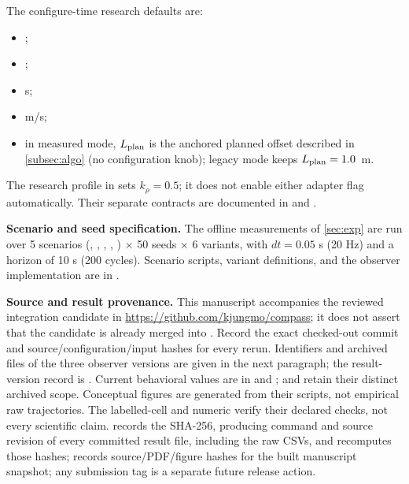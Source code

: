 The configure-time research defaults are:
\begin{itemize}
\setlength{\itemsep}{0pt}
\setlength{\parsep}{0pt}
\item {};
\item {};
\item {} s;
\item {} m/s;
\item in measured mode, $L_{\rm plan}$ is the anchored planned offset described in \cref{subsec:algo} (no configuration knob); legacy mode keeps $L_{\rm plan}=1.0$~m.
\end{itemize}

The research profile in  sets $k_\rho=0.5$; it does not enable either adapter flag automatically. Their separate contracts are documented in  and .



\noindent\textbf{Scenario and seed specification.} The offline measurements of \cref{sec:exp} are run over 5 scenarios (, , , , ) $\times$ 50 seeds $\times$ 6 variants, with $dt = 0.05$ s (20 Hz) and a horizon of 10 s (200 cycles). Scenario scripts, variant definitions, and the observer implementation are in .

\noindent\textbf{Source and result provenance.} This manuscript accompanies the reviewed integration candidate in \url{https://github.com/kjungmo/compass}; it does not assert that the candidate is already merged into . Record the exact checked-out commit and source/configuration/input hashes for every rerun. Identifiers and archived files of the three observer versions are given in the next paragraph; the result-version record is . Current behavioral values are in  and ;  and  retain their distinct archived scope. Conceptual figures are generated from their scripts, not empirical raw trajectories. The labelled-cell  and numeric  verify their declared checks, not every scientific claim.  records the SHA-256, producing command and source revision of every committed result file, including the raw CSVs, and  recomputes those hashes;  records source/PDF/figure hashes for the built manuscript snapshot; any submission tag is a separate future release action.


